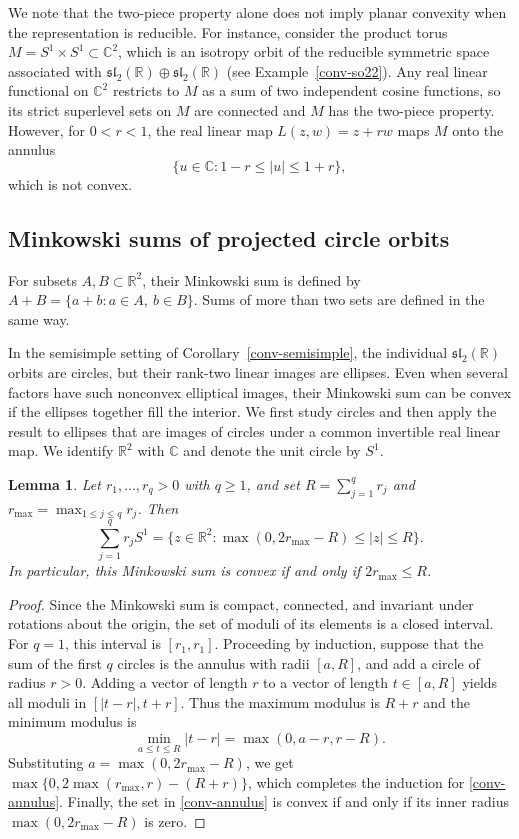 \documentclass[11pt,reqno]{amsart}
\newtheorem{lemma}[theorem]{Lemma}
\theoremstyle{remark}
\newcommand{\R}{\mathbb R}
\newcommand{\C}{\mathbb C}
\begin{document}
We note that the two-piece property alone does not imply planar
convexity when the representation is reducible. For instance, consider
the product torus $M=S^1\times S^1\subset\C^2$, which is an isotropy
orbit of the reducible symmetric space associated with
$\mathfrak{sl}_2(\R)\oplus\mathfrak{sl}_2(\R)$ (see
Example~\ref{conv-so22}). Any real linear functional on $\C^2$ restricts
to $M$ as a sum of two independent cosine functions, so its strict
superlevel sets on $M$ are connected and $M$ has the two-piece property.
However, for $0<r<1$, the real linear map $L(z,w)=z+rw$ maps $M$ onto
the annulus
\[
 \{u\in\C:1-r\le|u|\le1+r\},
\]
which is not convex.

\subsection{Minkowski sums of projected circle orbits}\label{subsec:exceptional-sums}

For subsets $A,B\subset\R^2$, their Minkowski sum is defined by
$A+B=\{a+b:a\in A,\ b\in B\}$. Sums of more than two sets are
defined in the same way.

In the semisimple setting of Corollary~\ref{conv-semisimple}, the
individual $\mathfrak{sl}_2(\R)$ orbits are circles, but their rank-two
linear images are ellipses. Even when several factors have such
nonconvex elliptical images, their Minkowski sum can be convex if the
ellipses together fill the interior. We first study circles and then
apply the result to ellipses that are images of circles under a common
invertible real linear map. We identify $\R^2$ with $\C$ and denote the
unit circle by $S^1$.

\begin{lemma}\label{conv-circle-sums}
Let $r_1,\ldots,r_q>0$ with $q\ge1$, and set $R=\sum_{j=1}^q r_j$ and
$r_{\max}=\max_{1\le j\le q} r_j$. Then
\begin{equation}\label{conv-annulus}
 \sum_{j=1}^q r_jS^1
 =\bigl\{z\in\R^2:\max(0,2r_{\max}-R)\le |z|\le R\bigr\}.
\end{equation}
In particular, this Minkowski sum is convex if and only if
$2r_{\max}\le R$.
\end{lemma}
\begin{proof}
Since the Minkowski sum is compact, connected, and invariant under
rotations about the origin, the set of moduli of its elements is a
closed interval. For $q=1$, this interval is $[r_1,r_1]$. Proceeding by
induction, suppose that the sum of the first $q$ circles is the annulus
with radii $[a,R]$, and add a circle of radius $r>0$. Adding a vector of
length $r$ to a vector of length $t\in[a,R]$ yields all moduli in
$[|t-r|,t+r]$. Thus the maximum modulus is $R+r$ and the minimum modulus
is
\[
 \min_{a\le t\le R}|t-r|
   =\max(0,a-r,r-R).
\]
Substituting $a=\max(0,2r_{\max}-R)$, we get
$\max\{0,2\max(r_{\max},r)-(R+r)\}$, which completes the induction for
\eqref{conv-annulus}. Finally, the set in \eqref{conv-annulus} is convex
if and only if its inner radius $\max(0,2r_{\max}-R)$ is zero.
\end{proof}
\end{document}
